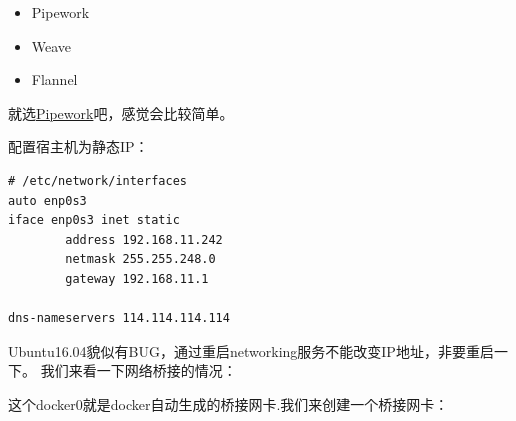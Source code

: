 \documentclass[12pt]{article}
\begin{document}
\begin{itemize}
\tightlist
\item
  Pipework
\item
  Weave
\item
  Flannel
\end{itemize}

就选\href{https://github.com/jpetazzo/pipework}{Pipework}吧，感觉会比较简单。

\begin{Shaded}
\begin{Highlighting}[]
\end{Highlighting}
\end{Shaded}

配置宿主机为静态IP：

\begin{verbatim}
# /etc/network/interfaces
auto enp0s3
iface enp0s3 inet static
        address 192.168.11.242
        netmask 255.255.248.0
        gateway 192.168.11.1

dns-nameservers 114.114.114.114
\end{verbatim}

Ubuntu16.04貌似有BUG，通过重启networking服务不能改变IP地址，非要重启一下。 我们来看一下网络桥接的情况：

\begin{Shaded}
\begin{Highlighting}[]
\end{Highlighting}
\end{Shaded}

这个docker0就是docker自动生成的桥接网卡.我们来创建一个桥接网卡：

\begin{Shaded}
\begin{Highlighting}[]
\end{Highlighting}
\end{Shaded}
\end{document}
